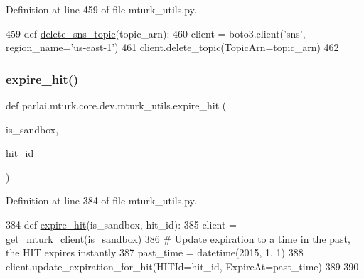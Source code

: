 Definition at line 459 of file mturk\+\_\+utils.\+py.


\begin{DoxyCode}
459 \textcolor{keyword}{def }\hyperlink{namespaceparlai_1_1mturk_1_1core_1_1mturk__utils_a669fa20824749469221df338aa8a0e8e}{delete\_sns\_topic}(topic\_arn):
460     client = boto3.client(\textcolor{stringliteral}{'sns'}, region\_name=\textcolor{stringliteral}{'us-east-1'})
461     client.delete\_topic(TopicArn=topic\_arn)
462 \end{DoxyCode}
\mbox{\label{namespaceparlai_1_1mturk_1_1core_1_1dev_1_1mturk__utils_a26e9e405bc015ef647ef58a133c88f40}} 
\subsubsection{\texorpdfstring{expire\+\_\+hit()}{expire\_hit()}}
{\footnotesize\ttfamily def parlai.\+mturk.\+core.\+dev.\+mturk\+\_\+utils.\+expire\+\_\+hit (\begin{DoxyParamCaption}\item[{}]{is\+\_\+sandbox,  }\item[{}]{hit\+\_\+id }\end{DoxyParamCaption})}



Definition at line 384 of file mturk\+\_\+utils.\+py.


\begin{DoxyCode}
384 \textcolor{keyword}{def }\hyperlink{namespaceparlai_1_1mturk_1_1core_1_1mturk__utils_a960c8639f5fa43ab8be109eb48ea1925}{expire\_hit}(is\_sandbox, hit\_id):
385     client = \hyperlink{namespaceparlai_1_1mturk_1_1core_1_1mturk__utils_a577e2527c04682284394b0951a090695}{get\_mturk\_client}(is\_sandbox)
386     \textcolor{comment}{# Update expiration to a time in the past, the HIT expires instantly}
387     past\_time = datetime(2015, 1, 1)
388     client.update\_expiration\_for\_hit(HITId=hit\_id, ExpireAt=past\_time)
389 
390 
\end{DoxyCode}
\mbox{\label{namespaceparlai_1_1mturk_1_1core_1_1dev_1_1mturk__utils_ab4c0dfc58f9fe37c28c9d23628d1de4e}} 
